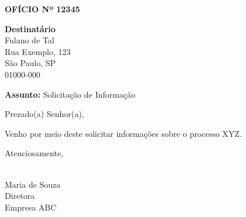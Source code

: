 \documentclass[a4paper,12pt]{article}
\begin{document}
\begin{center}
    \textbf{OFÍCIO Nº 12345}
\end{center}

\vspace{1cm}

\begin{flushright}
    \textbf{Destinatário} \\
    Fulano de Tal \\
    Rua Exemplo, 123 \\
    São Paulo, SP \\
    01000-000
\end{flushright}

\vspace{1cm}

\textbf{Assunto:} Solicitação de Informação

\vspace{1cm}

Prezado(a) Senhor(a),

\bigskip

Venho por meio deste solicitar informações sobre o processo XYZ.

\bigskip

Atenciosamente,

\vspace{1cm}

\hrulefill \\
Maria de Souza \\
Diretora \\
Empresa ABC \\
\end{document}

